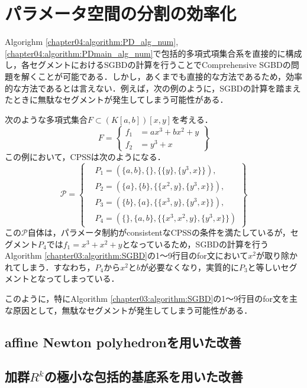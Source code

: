 \section{パラメータ空間の分割の効率化}
Algorighm \ref{chapter04:algorithm:PD_alg_num}, \ref{chapter04:algorithm:PDmain_alg_num}で包括的多項式項集合系を直接的に構成し，各セグメントにおけるSGBDの計算を行うことでComprehensive SGBDの問題を解くことが可能である．しかし，あくまでも直接的な方法であるため，効率的な方法であるとは言えない．例えば，次の例のように，SGBDの計算を踏まえたときに無駄なセグメントが発生してしまう可能性がある．
\begin{example}
	次のような多項式集合$F \subset (K[a, b])[x, y]$を考える．
	\begin{equation*}
		F = \left\{
			\begin{aligned}
				f_1 &= ax^3 + bx^2 + y \\
				f_2 &= y^3 + x
			\end{aligned}
		\right\}
	\end{equation*}
	この例において，CPSSは次のようになる．
	\begin{equation*}
		\mathcal{P} = 
		\left\{
			\begin{aligned}
				&P_1 = \left( \{a, b\}, \{\}, \{ \{y\}, \{y^3, x\} \} \right), \\
				&P_2 = \left( \{a\}, \{b\}, \{ \{x^2, y\}, \{y^3, x\} \} \right), \\
				&P_3 = \left( \{b\}, \{a\}, \{ \{x^3, y\}, \{y^3, x\} \} \right), \\
				&P_4 = \left( \{\}, \{a, b\}, \{ \{x^3, x^2, y\}, \{y^3, x\} \} \right)
			\end{aligned}
		\right\}
	\end{equation*}
	この$\mathcal{P}$自体は，パラメータ制約がconsistentなCPSSの条件を満たしているが，セグメント$P_4$では$f_1 = x^3 + x^2 + y$となっているため，SGBDの計算を行うAlgorithm \ref{chapter03:algorithm:SGBD}の1〜9行目のfor文において$x^2$が取り除かれてしまう．すなわち，$P_4$から$x^2$と$b$が必要なくなり，実質的に$P_3$と等しいセグメントとなってしまっている．
\end{example}
このように，特にAlgorithm \ref{chapter03:algorithm:SGBD}の1〜9行目のfor文を主な原因として，無駄なセグメントが発生してしまう可能性がある．

\subsection{affine Newton polyhedronを用いた改善}







\subsection{加群$R^k$の極小な包括的\groebner{}基底系を用いた改善}










